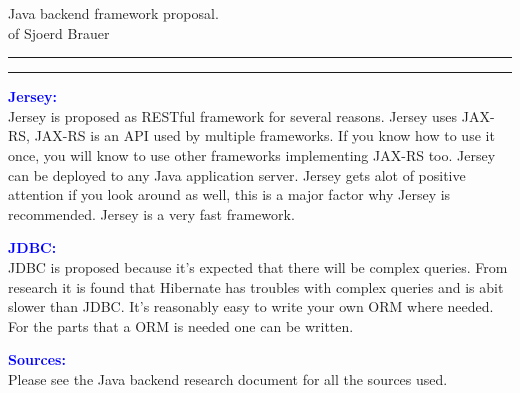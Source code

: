 \documentclass{article}
\newcommand{\soptitle}{Java backend framework proposal.}
\newcommand{\yourname}{Sjoerd Brauer}
\newcommand{\statement}[1]{\par\medskip
  \textcolor{blue}{\textbf{#1:}}\space
}
\begin{document}
\begin{center}\LARGE\soptitle\\
	\large of \yourname\ 
\end{center}

\hrule
\vspace{1pt}
\hrule height 1pt

\bigskip

\statement{Jersey} \\
Jersey is proposed as RESTful framework for several reasons. Jersey uses JAX-RS, JAX-RS is an API used by multiple frameworks. If you know how to use it once, you will know to use other frameworks implementing JAX-RS too. Jersey can be deployed to any Java application server. Jersey gets alot of positive attention if you look around as well, this is a major factor why Jersey is recommended. Jersey is a very fast framework.

\bigskip
\statement{JDBC} \\
JDBC is proposed because it's expected that there will be complex queries. From research it is found that Hibernate has troubles with complex queries and is abit slower than JDBC. It's reasonably easy to write your own ORM where needed. For the parts that a ORM is needed one can be written.

\bigskip
\statement{Sources} \\
Please see the Java back\-end research document for all the  sources used.
\end{document}
